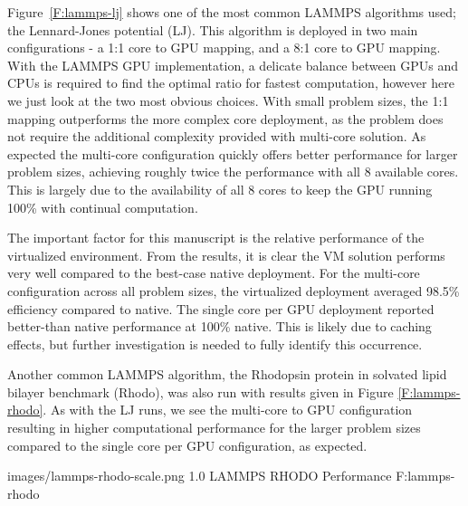 Figure~\ref{F:lammps-lj} shows one of the most common LAMMPS algorithms used; the Lennard-Jones potential (LJ).  This algorithm is deployed in two main configurations - a 1:1 core to GPU mapping, and a 8:1 core to GPU mapping.  With the LAMMPS GPU implementation, a delicate balance between GPUs and CPUs is required to find the optimal ratio for fastest computation, however here we just look at the two most obvious choices. With small problem sizes, the 1:1 mapping outperforms the more complex core deployment, as the problem does not require the additional complexity provided with multi-core solution.  As expected the multi-core configuration quickly offers better performance for larger problem sizes, achieving roughly twice the performance with all 8 available cores. This is largely due to the availability of all 8 cores to keep the GPU running 100\% with continual computation.
 
The important factor for this manuscript is the relative performance of the virtualized environment. From the results, it is clear the VM solution performs very well compared to the best-case native deployment. For the multi-core configuration across all problem sizes, the virtualized deployment averaged 98.5\% efficiency compared to native. The single core per GPU deployment reported better-than native performance at 100\% native.  This is likely due to caching effects, but further investigation is needed to fully identify this occurrence. 



Another common LAMMPS algorithm, the Rhodopsin protein in solvated lipid bilayer benchmark (Rhodo), was also run with results given in Figure \ref{F:lammps-rhodo}. As with the LJ runs, we see the multi-core to GPU configuration resulting in higher computational performance for the larger problem sizes compared to the single core per GPU configuration, as expected.  

  {images/lammps-rhodo-scale.png}
  {1.0}
  {LAMMPS RHODO Performance}
  {F:lammps-rhodo}

